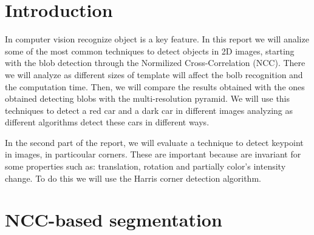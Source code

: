 \chapter*{Introduction}

In computer vision recognize object is a key feature. In this report we will analize some of the most common techniques to detect objects in 2D images, starting with the blob detection through the Normilized Cross-Correlation (NCC). There we will analyze as different sizes of template will affect the bolb recognition and the computation time. Then, we will compare the results obtained with the ones obtained detecting blobs with the multi-resolution pyramid. We will use this techniques to detect a red car and a dark car in different images analyzing as different algorithms detect these cars in different ways.

In the second part of the report, we will evaluate a technique to detect keypoint in images, in particoular corners. These are important because are invariant for some properties such as: translation, rotation and partially color's intensity change. To do this we will use the Harris corner detection algorithm.
\chapter{NCC-based segmentation}

